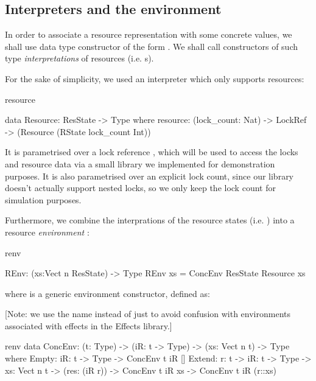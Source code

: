 \subsection{Interpreters and the environment}

In order to associate a  resource representation with some
concrete values, we shall use data type constructor of the form
. We shall call constructors of such type
\emph{interpretations} of resources (i.e. s).

For the sake of simplicity, we used an interpreter which only
supports  resources:

\begin{SaveVerbatim}{resource}

data Resource: ResState -> Type where
     resource: (lock_count: Nat) -> LockRef ->
                    (Resource (RState lock_count Int))

\end{SaveVerbatim}

It is parametrised over a lock reference , which will be used to
access the locks and resource data via a small library we implemented for
demonstration purposes. It is also parametrised over an explicit lock count,
since our library doesn't actually support nested locks, so we only keep the
lock count for simulation purposes.

Furthermore, we combine the interprations of the resource states (i.e.
) into a resource \emph{environment} :

\begin{SaveVerbatim}{renv}

REnv: (xs:Vect n ResState) -> Type
REnv xs = ConcEnv ResState Resource xs

\end{SaveVerbatim}

where  is a generic environment constructor, defined as:

[Note: we use the name  instead of just  to avoid
confusion with environments associated with effects in the Effects library.]

\begin{SaveVerbatim}{renv}
data ConcEnv: (t: Type) -> (iR: t -> Type) -> (xs: Vect n t) -> Type where
   Empty:  {iR: t -> Type} -> ConcEnv t iR []
   Extend: {r: t} -> {iR: t -> Type} -> {xs: Vect n t} ->
                     (res: (iR r)) -> ConcEnv t iR xs ->
                     ConcEnv t iR (r::xs)
\end{SaveVerbatim}

